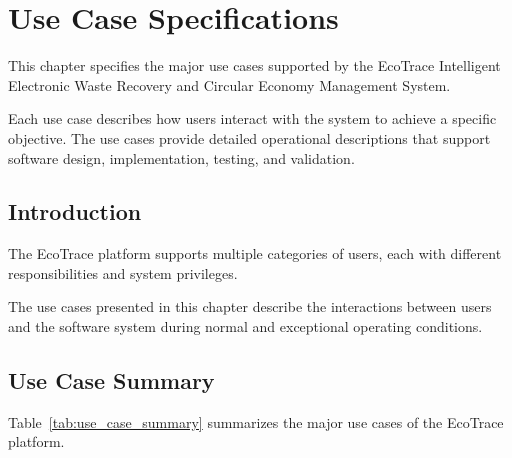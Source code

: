\chapter{Use Case Specifications}
\label{chap:use-case-specifications}

This chapter specifies the major use cases supported by the EcoTrace
Intelligent Electronic Waste Recovery and Circular Economy Management
System.

Each use case describes how users interact with the system to achieve a
specific objective. The use cases provide detailed operational
descriptions that support software design, implementation, testing, and
validation.


\section{Introduction}

The EcoTrace platform supports multiple categories of users, each with
different responsibilities and system privileges.

The use cases presented in this chapter describe the interactions
between users and the software system during normal and exceptional
operating conditions.

\section{Use Case Summary}

Table~\ref{tab:use_case_summary} summarizes the major use cases of the
EcoTrace platform.

